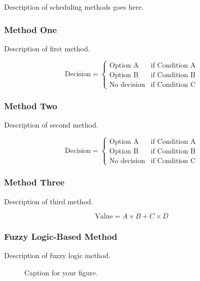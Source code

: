 \documentclass[12pt]{article}
\begin{document}
Description of scheduling methods goes here.

\subsubsection{Method One}

Description of first method.

\begin{equation}
\text{Decision} = \begin{cases}
\text{Option A} & \text{if Condition A} \\
\text{Option B} & \text{if Condition B} \\
\text{No decision} & \text{if Condition C}
\end{cases}
\label{eq:decision_rule1}
\end{equation}

\subsubsection{Method Two}

Description of second method.

\begin{equation}
\text{Decision} = \begin{cases}
\text{Option A} & \text{if Condition A} \\
\text{Option B} & \text{if Condition B} \\
\text{No decision} & \text{if Condition C}
\end{cases}
\label{eq:decision_rule2}
\end{equation}

\subsubsection{Method Three}

Description of third method.

\begin{equation}
\text{Value} = A \times B + C \times D
\label{eq:composite}
\end{equation}

\subsubsection{Fuzzy Logic-Based Method}

Description of fuzzy logic method.

\begin{figure}[h!]
\centering
\caption{Caption for your figure.}
\label{fig:membership}
\end{figure}
\end{document}
